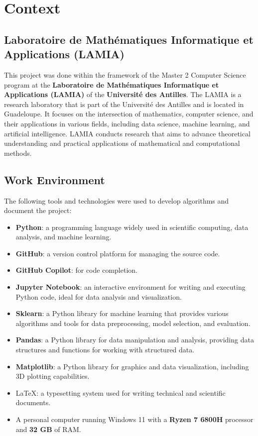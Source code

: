 \chapter{Context}
\label{chap:context}

\section{Laboratoire de Mathématiques Informatique et Applications (LAMIA)}
\label{sec:lamia}

This project was done within the framework of the Master 2 Computer Science program at the
\textbf{Laboratoire de Mathématiques Informatique et Applications (LAMIA)} of the \textbf{Université des Antilles}.
The LAMIA is a research laboratory that is part of the Université des Antilles and is located in Guadeloupe. It focuses on the
intersection of mathematics, computer science, and their applications in various fields, including data science,
machine learning, and artificial intelligence. LAMIA conducts research that aims to advance theoretical understanding
and practical applications of mathematical and computational methods.

\section{Work Environment}
\label{sec:work_environment}

The following tools and technologies were used to develop algorithms and document the project:

\begin{itemize}
	\item \textbf{Python}: a programming language widely used in scientific computing, data analysis, and machine learning.
	\item \textbf{GitHub}: a version control platform for managing the source code.
	\item \textbf{GitHub Copilot}: for code completion.
	\item \textbf{Jupyter Notebook}: an interactive environment for writing and executing Python code, ideal for data analysis and
	      visualization.
	\item \textbf{Sklearn}: a Python library for machine learning that provides various algorithms and tools for data preprocessing,
	      model selection, and evaluation.
	\item \textbf{Pandas}: a Python library for data manipulation and analysis, providing data structures and functions for working with
	      structured data.
	\item \textbf{Matplotlib}: a Python library for graphics and data visualization, including 3D plotting capabilities.
	\item \LaTeX : a typesetting system used for writing technical and scientific documents.
	\item A personal computer running Windows 11 with a \textbf{Ryzen 7 6800H} processor and \textbf{32 GB} of RAM.
\end{itemize}

